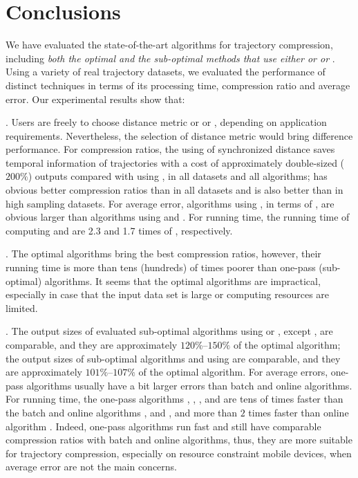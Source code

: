 \vspace{-1ex}
\section{Conclusions}

We have evaluated the state-of-the-art \lsa algorithms for trajectory compression, including \emph{both the optimal and the sub-optimal methods that use either \ped or \sed or \dad}.
Using a variety of real trajectory datasets, we evaluated the performance of distinct techniques in terms of its processing time, compression ratio and average error.
Our experimental results show that:

\emph{}. Users are freely to choose distance metric \sed or \ped or \dad, depending on application requirements. Nevertheless, the selection of distance metric would bring difference performance.
For compression ratios, the using of synchronized distance \sed saves temporal information of trajectories with a cost of approximately double-sized (\ie $200\%$) outputs compared with using \ped, in all datasets and all algorithms; \ped has obvious better compression ratios than \dad in all datasets and \sed is also better than \dad in high sampling datasets.
For average error, algorithms using \dad, in terms of \ped, are obvious larger than algorithms using \ped and \sed.
For running time, the running time of computing \ped and \sed are 2.3 and 1.7 times of \dad, respectively.

\emph{}. The optimal algorithms bring the best compression ratios, however, their running time is more than tens (hundreds) of times poorer than one-pass (sub-optimal) algorithms. It seems that the optimal algorithms are impractical, especially in case that the input data set is large or computing resources are limited.

\emph{}. The output sizes of evaluated sub-optimal algorithms using \ped or \sed, except \squishe, are comparable, and they are approximately $120\%$--$150\%$ of the optimal algorithm; the output sizes of sub-optimal algorithms \tpa and \interval using \dad are comparable, and they are approximately $101\%$--$107\%$ of the optimal algorithm.
For average errors, one-pass algorithms usually have a bit larger errors than batch and online algorithms.
For running time, the one-pass algorithms \operb, \siped, \cised, \intersec and \interval are tens of times faster than the batch and online algorithms \tpa, \dpa and \bqsa, and more than $2$ times faster than online algorithm \squishe. Indeed, one-pass algorithms run fast and still have comparable compression ratios with batch and online algorithms, thus, they are more suitable for trajectory compression, especially on resource constraint mobile devices, when average error are not the main concerns.

